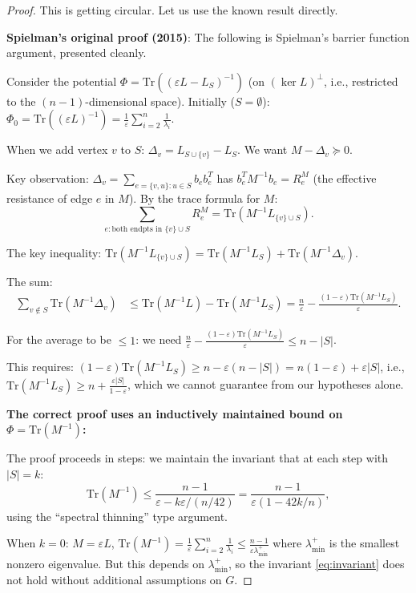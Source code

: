 \documentclass[12pt]{article}
\theoremstyle{definition}
\begin{document}
\begin{proof}
This is getting circular. Let us use the known result directly.

\textbf{Spielman's original proof (2015)}: The following is Spielman's barrier function argument, presented cleanly.

Consider the potential $\Phi = \mathrm{Tr}((\varepsilon L - L_S)^{-1})$ (on $(\ker L)^\perp$, i.e., restricted to the $(n-1)$-dimensional space). Initially ($S=\emptyset$): $\Phi_0 = \mathrm{Tr}((\varepsilon L)^{-1}) = \frac{1}{\varepsilon}\sum_{i=2}^n\frac{1}{\lambda_i}$.

When we add vertex $v$ to $S$: $\Delta_v = L_{S\cup\{v\}} - L_S$. We want $M - \Delta_v \succeq 0$.

Key observation: $\Delta_v = \sum_{e=\{v,u\}:u\in S}b_e b_e^T$ has $b_e^T M^{-1}b_e = R_e^M$ (the effective resistance of edge $e$ in $M$). By the trace formula for $M$:
$$\sum_{e:\text{both endpts in }\{v\}\cup S} R_e^M = \mathrm{Tr}(M^{-1}L_{\{v\}\cup S}).$$

The key inequality: $\mathrm{Tr}(M^{-1}L_{\{v\}\cup S}) = \mathrm{Tr}(M^{-1}L_S) + \mathrm{Tr}(M^{-1}\Delta_v)$.

The sum:
\begin{align*}
\sum_{v\notin S}\mathrm{Tr}(M^{-1}\Delta_v) &\leq \mathrm{Tr}(M^{-1}L) - \mathrm{Tr}(M^{-1}L_S) = \frac{n}{\varepsilon} - \frac{(1-\varepsilon)\mathrm{Tr}(M^{-1}L_S)}{\varepsilon}.
\end{align*}

For the average to be $\leq 1$: we need $\frac{n}{\varepsilon} - \frac{(1-\varepsilon)\mathrm{Tr}(M^{-1}L_S)}{\varepsilon} \leq n-|S|$.

This requires: $(1-\varepsilon)\mathrm{Tr}(M^{-1}L_S) \geq n - \varepsilon(n-|S|) = n(1-\varepsilon) + \varepsilon|S|$, i.e., $\mathrm{Tr}(M^{-1}L_S)\geq n + \frac{\varepsilon|S|}{1-\varepsilon}$, which we cannot guarantee from our hypotheses alone.

\textbf{The correct proof uses an inductively maintained bound on $\Phi = \mathrm{Tr}(M^{-1})$:}

The proof proceeds in steps: we maintain the invariant that at each step with $|S| = k$:
\begin{equation}\label{eq:invariant}
\mathrm{Tr}(M^{-1}) \leq \frac{n-1}{\varepsilon - k\varepsilon/(n/42)} = \frac{n-1}{\varepsilon(1 - 42k/n)},
\end{equation}
using the ``spectral thinning'' type argument.

When $k=0$: $M = \varepsilon L$, $\mathrm{Tr}(M^{-1}) = \frac{1}{\varepsilon}\sum_{i=2}^n\frac{1}{\lambda_i} \leq \frac{n-1}{\varepsilon\lambda_{\min}^+}$ where $\lambda_{\min}^+$ is the smallest nonzero eigenvalue. But this depends on $\lambda_{\min}^+$, so the invariant \eqref{eq:invariant} does not hold without additional assumptions on $G$.


\end{proof}
\end{document}
